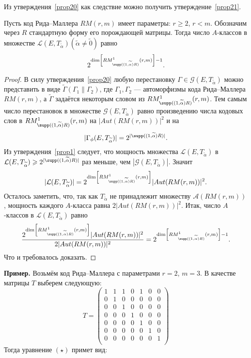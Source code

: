 Из утверждения~\ref{prop20} как следствие можно получить
утверждение~\ref{prop21}.

\begin{proposition}\label{prop21}
Пусть код Рида--Маллера $RM(r,m)$ имеет параметры: $r\geqslant 2$,
$r<m$. Обозначим через $R$ стандартную форму его порождающей
матрицы. Тогда число $A$-классов в множестве $\mathcal
L(E,T_{\widetilde\alpha})(\widetilde\alpha\neq\widetilde 0)$ равно
$$
2^{\dim \left[RM^1_{\supp((1,\widetilde\alpha)R)}(r,m)\right]-1}.
$$
\end{proposition}
\begin{proof}
В силу утверждения~\ref{prop20} любую перестановку
$\Gamma\in\mathcal G(E,T_{\widetilde\alpha})$ можно представить в
виде $\widetilde\Gamma(\Gamma_1\|\Gamma_2)$, где
$\Gamma_1,\Gamma_2$ --- автоморфизмы кода Рида--Маллера $RM(r,m)$,
а $\widetilde\Gamma$ задаётся некоторым словом из
$RM^1_{\supp((1,\widetilde\alpha)R)}(r,m)$. Тем самым число
перестановок в множестве $\mathcal G(E,T_{\widetilde\alpha})$
равно произведению числа кодовых слов в
$RM^1_{\supp((1,\widetilde\alpha)R)}(r,m)$ на $|Aut(RM(r,m))|^2$ и
на
$$|\Gamma_{\phi}(E,T_{\widetilde\alpha})|=2^{|\supp((1,\widetilde\alpha)R)|}.$$
Из утверждения~\ref{prop1} следует, что мощность множества
$\mathcal L(E,T_{\widetilde\alpha})$ в
$\mathcal L(E,T_{\widetilde\alpha})\geqslant 2^{|\supp((1,\widetilde\alpha)R)|}$ раз меньше, чем $|\mathcal
G(E,T_{\widetilde\alpha})|$. Значит
$$
|\mathcal L(E,T_{\widetilde\alpha})|=2^{\dim
\left[RM^1_{\supp((1,\widetilde\alpha)R)}(r,m)\right]}|Aut(RM(r,m))|^2.
$$
Осталось заметить, что, так как $T_{\widetilde\alpha}$ не
принадлежит множеству $\mathcal A(RM(r,m))$, мощность каждого
$A$-класса равна $2|Aut(RM(r,m))|^2$. Итак, число $A$-классов в
$\mathcal L(E,T_{\widetilde\alpha})$ равно
$$
\frac{2^{\dim
\left[RM^1_{\supp((1,\widetilde\alpha)R)}(r,m)\right]}|Aut(RM(r,m))|^2}{2|Aut(RM(r,m))|^2}=2^{\dim
\left[RM^1_{\supp((1,\widetilde\alpha)R)}(r,m)\right]-1}.
$$
Что и требовалось доказать.
\end{proof}

\noindent\textbf{Пример.} Возьмём код Рида--Маллера с параметрами
$r=2$, $m=3$. В качестве матрицы $T$ выберем следующую:
$$
T=\begin{pmatrix}
1&1&1&0&1&0&0\\
0&1&0&0&0&0&0\\
0&0&1&0&0&0&0\\
0&0&0&1&0&0&0\\
0&0&0&0&1&0&0\\
0&0&0&0&0&1&0\\
0&0&0&0&0&0&1\\
\end{pmatrix}
$$
Тогда уравнение $(\star)$ примет вид: \vspace{10pt}


